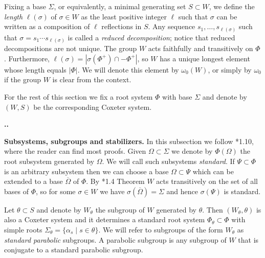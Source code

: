 \documentclass[11pt,fleqn]{amsart}
\renewcommand\thesection{\arabic{section}}
\newcounter{para}[section]
\renewcommand\thepara{\thesection.\arabic{para}}
\def\paragraph{%
 \noindent
 \refstepcounter{para}%
 \textbf{\thepara.}\hspace{1ex}%
}
\newcommand\about[1]{%
 {\bfseries#1.}%
}
\begin{document}
Fixing a base $\Sigma$, or equivalently, a minimal generating set $S \subset 
W$, we define the \emph{length} $\ell(\sigma)$ of $\sigma \in W$ as the least 
positive integer $\ell$ such that $\sigma$ can be written as a composition of 
$\ell$ reflections in $S$. Any sequence $s_1, \ldots, s_{\ell(\sigma)}$ such 
that $\sigma = s_1 \cdots s_{\ell(\sigma)}$ is called a \emph{reduced 
decomposition}; notice that reduced decompositions are not unique. The group 
$W$ acts faithfully and transitively on 
$\Phi$. Furthermore, $\ell(\sigma) = |\sigma(\Phi^+) \cap -\Phi^+|$, so $W$ 
has a unique longest element whose length equals $|\Phi|$. We will denote this 
element by $\omega_0(W)$, or simply by $\omega_0$ if the group $W$ is clear 
from the context.

For the rest of this section we fix a root system $\Phi$ with base $\Sigma$ 
and denote by $(W,S)$ be the corresponding Coxeter system. 

\paragraph
\about{Subsystems, subgroups and stabilizers} In this subsection we follow
\cite{Hump-coxeter-book}*{1.10}, where the reader can find most proofs.
Given $\Omega \subset \Sigma$ we denote by 
$\Phi(\Omega)$ the root subsystem generated by $\Omega$. We will call such 
subsystems \emph{standard}. If $\Psi \subset \Phi$ is an arbitrary subsystem 
then we can choose a base $\Omega \subset \Psi$ which can be extended to a 
base $\overline \Omega$ of $\Phi$. By \cite{Hump-coxeter-book}*{1.4 Theorem} 
$W$ acts transitively on the set of all bases of $\Phi$, so for some $\sigma 
\in W$ we have $\sigma(\overline \Omega) = \Sigma$ and hence $\sigma(\Psi)$ is 
standard. 

Let $\theta \subset S$ and denote by $W_\theta$ the subgroup of $W$ generated 
by $\theta$. Then $(W_\theta, \theta)$ is also a Coxeter system and it 
determines a standard root system $\Phi_\theta \subset \Phi$ with simple roots 
$\Sigma_\theta = \{\alpha_s \mid s \in \theta\}$. We will refer to subgroups 
of the form $W_\theta$ as \emph{standard parabolic} subgroups. A parabolic 
subgroup is any subgroup of $W$ that is conjugate to a standard parabolic 
subgroup.
\end{document}
